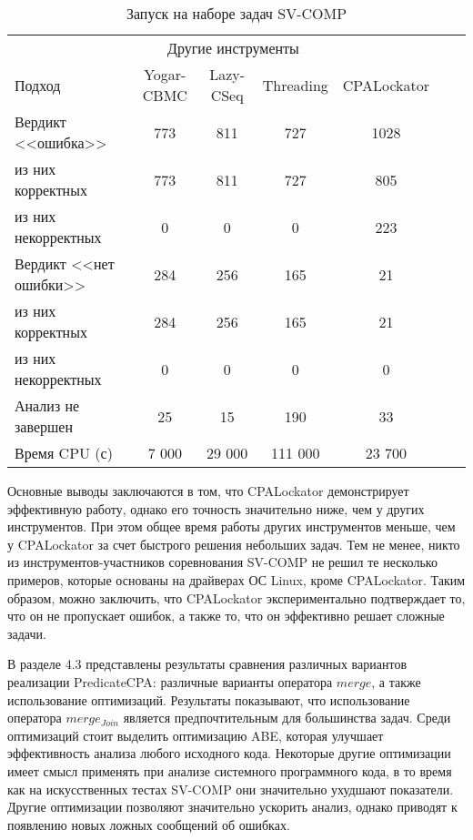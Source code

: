 \begin{center}
  \begin{table}[h]\footnotesize \centering
  	\label{table-sv-comp-tools}
    \caption{Запуск на наборе задач SV-COMP}
    \begin{tabular}{ | l | c | c | c | c | c | c |}
      \hline
      		 & \multicolumn{3}{c|}{Другие инструменты} & 		 \\
      Подход         				& Yogar-CBMC 	& Lazy-CSeq  & Threading & CPALockator   \\ \hline
      Вердикт <<ошибка>> 			& 773       	& 811       & 727      & 1028    			\\ 
  \hspace{0.5cm} из них корректных 	& 773       	& 811       & 727      & 805 				\\ 
  \hspace{0.5cm} из них некорректных& 0    		& 0       		& 0      & 223 		     \\ \hline
      Вердикт <<нет ошибки>>  		& 284        	& 256     & 165     & 21      		  \\ 
  \hspace{0.5cm} из них корректных 	& 284        	& 256     & 165   	& 21      		      \\
  \hspace{0.5cm} из них некорректных & 0 			& 0       	& 0         	& 0        \\ \hline
      Анализ не завершен       		& 25        	& 15      & 190     & 33     		 	\\ \hline
      Время CPU (с)   				& 7 000    		& 29 000   & 111 000  & 23 700 			 \\ 
      \hline
    \end{tabular}
  \end{table}
\end{center}

Основные выводы заключаются в том, что CPALockator демонстрирует эффективную работу, однако его точность значительно ниже, чем у других инструментов.
При этом общее время работы других инструментов меньше, чем у CPALockator за счет быстрого решения небольших задач.
Тем не менее, никто из инструментов-участников соревнования SV-COMP не решил те несколько примеров, которые основаны на драйверах ОС Linux, кроме CPALockator.
Таким образом, можно заключить, что CPALockator экспериментально подтверждает то, что он не пропускает ошибок, а также то, что он эффективно решает сложные задачи.

В разделе 4.3 представлены результаты сравнения различных вариантов реализации PredicateCPA: различные варианты оператора $merge$, а также использование оптимизаций.
Результаты показывают, что использование оператора $merge_{Join}$ является предпочтительным для большинства задач.
Среди оптимизаций стоит выделить оптимизацию ABE, которая улучшает эффективность анализа любого исходного кода.
Некоторые другие оптимизации имеет смысл применять при анализе системного программного кода, в то время как на искусственных тестах SV-COMP они значительно ухудшают показатели.
Другие оптимизации позволяют значительно ускорить анализ, однако приводят к появлению новых ложных сообщений об ошибках.

